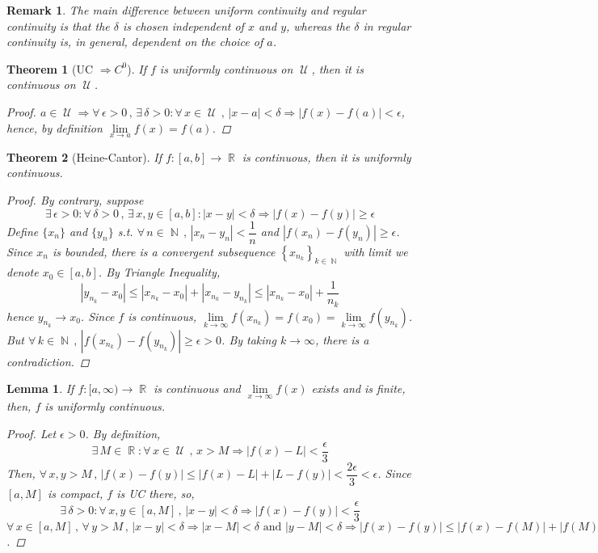 \documentclass[12pt]{article}
\let\RA\Rightarrow
\newcommand{\Forall}[1]{\forall\,{#1}\,,\,}
\newcommand{\Exist}[1]{\exists\,{#1}:}
\newcommand{\seq}[2]{\left\{{#1}\right\}_{#2 \in\N}}
\DeclareMathOperator{\N}{\mathbb{N}}
\DeclareMathOperator{\R}{\mathbb{R}}
\DeclareMathOperator{\U}{\mathcal{U}}
\newtheorem{theorem}{Theorem}[subsection]
\newtheorem{lemma}{Lemma}[subsection]
\newtheorem{remark}{Remark}[subsection]
\begin{document}
\begin{remark}
  The main difference between uniform continuity and regular continuity is that the $\delta$ is chosen independent of $x$ and $y$, whereas the $\delta$ in regular continuity is, in general, dependent on the choice of $a$.
\end{remark}

\begin{theorem}[UC $\RA C^0$]
  If $f$ is uniformly continuous on $\U$, then it is continuous on $\U$.
  \begin{proof}
    $a\in \U\RA\Forall{\epsilon>0}\Exist{\delta>0}\Forall{x\in\U} |x-a|<\delta\RA|f(x)-f(a)|<\epsilon$, hence, by definition $\lim\limits_{x\to a}f(x)=f(a)$.
  \end{proof}
\end{theorem}

\begin{theorem}[Heine-Cantor]
  If $f:[a,b]\to \R$ is continuous, then it is uniformly continuous.
  \begin{proof}
    By contrary, suppose $$\Exist{\epsilon>0}\Forall{\delta>0}\Exist{x,y\in[a,b]}|x-y|<\delta\RA |f(x)-f(y)|\geq\epsilon$$
    Define $\{x_n\}$ and $\{y_n\}$ s.t. $\Forall{n\in\N}|x_n-y_n|<\dfrac{1}{n}$ and $|f(x_n)-f(y_n)|\geq\epsilon$. Since $x_n$ is bounded, there is a convergent subsequence $\seq{x_{n_k}}{k}$ with limit we denote $x_0\in[a,b]$. By Triangle Inequality, $$|y_{n_k}-x_0|\leq |x_{n_k}-x_0|+|x_{n_k}-y_{n_k}|\leq |x_{n_k}-x_0|+\dfrac{1}{n_k}$$ hence $y_{n_k}\to x_0$. Since $f$ is continuous, $\lim\limits_{k\to\infty}f(x_{n_k})=f(x_0)=\lim\limits_{k\to\infty}f(y_{n_k})$. But $\Forall{k\in\N}|f(x_{n_k})-f(y_{n_k})|\geq \epsilon>0$. By taking $k\to\infty$, there is a contradiction.
  \end{proof}
\end{theorem}

\begin{lemma}
  If $f:[a,\infty)\to\R$ is continuous and $\lim\limits_{x\to\infty}f(x)$ exists and is finite, then, $f$ is uniformly continuous.
  \begin{proof}
    Let $\epsilon>0$. By definition, $$\Exist{M\in\R}\Forall{x\in\U}x>M\RA |f(x)-L|<\dfrac{\epsilon}{3}$$ Then, $\Forall{x,y>M} |f(x)-f(y)|\leq |f(x)-L|+|L-f(y)|<\dfrac{2\epsilon}{3}<\epsilon$. Since $[a,M]$ is compact, $f$ is UC there, so, $$\Exist{\delta>0}\Forall{x,y\in[a,M]}|x-y|<\delta\RA|f(x)-f(y)|<\dfrac{\epsilon}{3}$$
    $\Forall{x\in[a,M]}\Forall{y>M} |x-y|<\delta\RA |x-M|<\delta\text{ and }|y-M|<\delta\RA|f(x)-f(y)|\leq |f(x)-f(M)|+|f(M)-f(y)|<\epsilon$.
  \end{proof}
\end{lemma}
\end{document}
